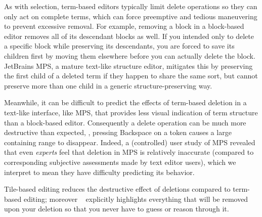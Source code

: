 As with selection, term-based editors typically
limit delete operations so they can only act on
complete terms, which can force preemptive and tedious
maneuvering to prevent excessive removal.
For example, removing a block in a block-based editor
removes all of its descendant blocks as well.
If you intended only to delete a specific block
while preserving its descendants, you are forced
to save its children first by moving them elsewhere
before you can actually delete the block.
JetBrains MPS, a mature text-like structure editor,
mitigates this by preserving the first child of a deleted term
if they happen to share the same sort,
but cannot preserve more than one child in a generic
structure-preserving way.

Meanwhile, it can be difficult to predict the
effects of term-based deletion in a text-like
interface, like MPS, that provides less visual
indication of term structure than a block-based editor.
Consequently a delete operation can be much
more destructive than expected, \eg,
pressing Backspace on a token
causes a large containing range to disappear.
Indeed, a (controlled) user study of MPS revealed
that even \emph{experts} feel that deletion in MPS
is relatively inaccurate (compared to corresponding
subjective assessments made by text editor users),
which we interpret to mean they have difficulty
predicting its behavior.


Tile-based editing reduces the destructive effect of deletions
compared to term-based editing; moreover \tylr~ explicitly
highlights everything that will be removed upon your deletion
so that you never have to guess or reason through it.







